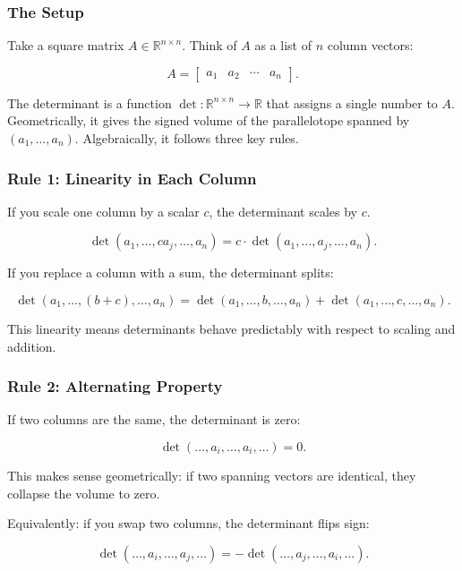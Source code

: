 \documentclass[
  letterpaper,
  DIV=11,
  numbers=noendperiod]{scrreprt}
\begin{document}
\subsubsection{The Setup}\label{the-setup}

Take a square matrix \(A \in \mathbb{R}^{n \times n}\). Think of \(A\)
as a list of \(n\) column vectors:

\[
A = \begin{bmatrix} a_1 & a_2 & \cdots & a_n \end{bmatrix}.
\]

The determinant is a function
\(\det: \mathbb{R}^{n \times n} \to \mathbb{R}\) that assigns a single
number to \(A\). Geometrically, it gives the signed volume of the
parallelotope spanned by \((a_1, \dots, a_n)\). Algebraically, it
follows three key rules.

\subsubsection{Rule 1: Linearity in Each
Column}\label{rule-1-linearity-in-each-column}

If you scale one column by a scalar \(c\), the determinant scales by
\(c\).

\[
\det(a_1, \dots, c a_j, \dots, a_n) = c \cdot \det(a_1, \dots, a_j, \dots, a_n).
\]

If you replace a column with a sum, the determinant splits:

\[
\det(a_1, \dots, (b+c), \dots, a_n) = \det(a_1, \dots, b, \dots, a_n) + \det(a_1, \dots, c, \dots, a_n).
\]

This linearity means determinants behave predictably with respect to
scaling and addition.

\subsubsection{Rule 2: Alternating
Property}\label{rule-2-alternating-property}

If two columns are the same, the determinant is zero:

\[
\det(\dots, a_i, \dots, a_i, \dots) = 0.
\]

This makes sense geometrically: if two spanning vectors are identical,
they collapse the volume to zero.

Equivalently: if you swap two columns, the determinant flips sign:

\[
\det(\dots, a_i, \dots, a_j, \dots) = -\det(\dots, a_j, \dots, a_i, \dots).
\]
\end{document}
